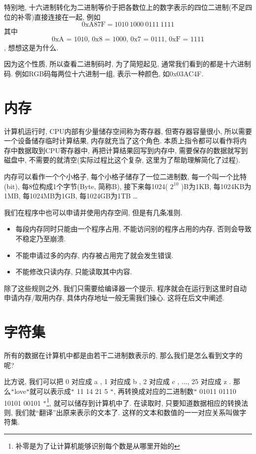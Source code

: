        特别地, 十六进制转化为二进制等价于把各数位上的数字表示的四位二进制(不足四位的补零)直接连接在一起, 例如 \[ \textrm{0xA87F} = 1010 \ 1000 \ 0111 \ 1111 \] 其中 \[ \textrm{0xA = 1010, 0x8 = 1000, 0x7 = 0111, 0xF = 1111} \], 想想这是为什么.

        因为这个性质, 所以查看二进制码时, 为了简短起见, 通常我们看到的都是十六进制码. 例如RGB码每两位十六进制一组, 表示一种颜色, 如0x03AC4F.

    \section{内存}
        计算机运行时, CPU内部有少量储存空间称为寄存器, 但寄存器容量很小, 所以需要一个设备储存临时计算结果, 内存就充当了这个角色. 本质上指令都可以看作将内存中数据取到CPU寄存器中, 再把计算结果回写到内存中, 需要保存的数据就写到磁盘中, 不需要的就清空(实际过程比这个复杂, 这里为了帮助理解简化了过程). 

        内存可以看作一个个小格子, 每个小格子储存了一位二进制数, 每一个叫一个比特(bit), 每8位构成1个字节(Byte, 简称B), 接下来每1024( $ 2 ^ {10} $ )B为1KB, 每1024KB为1MB, 每1024MB为1GB, 每1024GB为1TB \ldots

        我们在程序中也可以申请并使用内存空间, 但是有几条准则.
        \begin{itemize}
            \item 每段内存同时只能由一个程序占用, 不能访问别的程序占用的内存, 否则会导致不稳定乃至崩溃.
            \item 不能申请过多的内存, 内存被占用完了就会发生错误.
            \item 不能修改只读内存, 只能读取其中内容.
        \end{itemize}

        除了这些规则之外, 我们只需要给编译器一个提示, 程序就会在运行到这里时自动申请内存/取用内存, 具体内存地址一般无需我们操心. 这将在后文中阐述.

    

    \section{字符集} \label{字符集}
        所有的数据在计算机中都是由若干二进制数表示的, 那么我们是怎么看到文字的呢? 
        
        比方说, 我们可以把 0 对应成 a , 1 对应成 b , 2 对应成 c , ..., 25 对应成 z . 那么\texttt{"}love\texttt{"}就可以表示成\texttt{"} 11 14 21 5 \texttt{"}, 再转换成对应的二进制数\texttt{"} 01011 01110 10101 00101 \texttt{"}\footnote{补零是为了让计算机能够识别每个数是从哪里开始的}, 就可以储存到计算机中了. 在读取时, 只要知道数据相应的转换法则, 我们就``翻译''出原来表示的文本了. 这样的文本和数值的一一对应关系叫做字符集.

